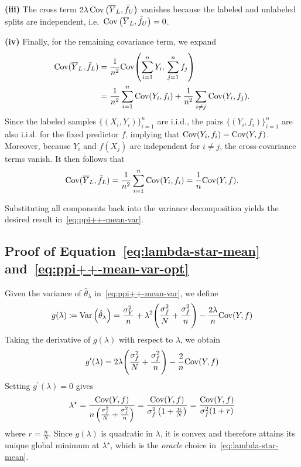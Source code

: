 \noindent
\textbf{(iii)} The cross term 
$2\lambda\,\mathrm{Cov}\left(\overline{Y}_L,\bar f_U\right)$ vanishes 
because the labeled and unlabeled splits are independent, i.e.\
$\mathrm{Cov}\left(\overline{Y}_L,\bar f_U\right)=0$.

\noindent
\textbf{(iv)} Finally, for the remaining covariance term, we expand
\begin{align*}
    \mathrm{Cov}(\overline{Y}_L,\bar f_L)
    &=\frac{1}{n^2}\mathrm{Cov}\!\left(\sum_{i=1}^n Y_i,\,\sum_{j=1}^n f_j\right)\\
    &=\frac{1}{n^2}\sum_{i=1}^n\mathrm{Cov}(Y_i,f_i)
      +\frac{1}{n^2}\sum_{i\neq j}\mathrm{Cov}(Y_i,f_j).
\end{align*}
Since the labeled samples $\{(X_i, Y_i)\}_{i=1}^n$ are i.i.d., 
the pairs $\{(Y_i, f_i)\}_{i=1}^n$ are also i.i.d. for the fixed predictor $f$, 
implying that $\mathrm{Cov}(Y_i,f_i)=\mathrm{Cov}(Y,f)$. Moreover, because $Y_i$ and $f(X_j)$ are independent for $i \neq j$, 
the cross-covariance terms vanish. It then follows that\[
    \mathrm{Cov}(\overline{Y}_L,\bar f_L)
    = \frac{1}{n^2}\sum_{i=1}^n \mathrm{Cov}(Y_i,f_i)
    = \frac{1}{n}\mathrm{Cov}(Y,f).
\]

\noindent
Substituting all components back into the variance decomposition yields the desired result in~\eqref{eq:ppi++-mean-var}.

\subsection{Proof of Equation~\eqref{eq:lambda-star-mean} and~\eqref{eq:ppi++-mean-var-opt}}
Given the variance of $\hat{\theta}_\lambda$ in~\eqref{eq:ppi++-mean-var}, we define \[
g(\lambda)\coloneqq\mathrm{Var}\left(\hat{\theta}_\lambda\right)
=\frac{\sigma_Y^2}{n}
+\lambda^2\Bigg(\frac{\sigma_f^2}{N}+\frac{\sigma_f^2}{n}\Bigg)
-\frac{2\lambda}{n}\mathrm{Cov}(Y,f)\]
Taking the derivative of $g(\lambda)$ with respect to $\lambda$, we obtain
\begin{align*}
    g^\prime(\lambda)= 2\lambda\Bigg(\frac{\sigma_f^2}{N}+\frac{\sigma_f^2}{n}\Bigg)-\frac{2}{n}\mathrm{Cov}(Y,f)
\end{align*}
Setting $g^\prime(\lambda)=0$ gives \[\lambda^\star=\frac{\mathrm{Cov}(Y,f)}{n\left(\frac{\sigma_f^2}{N}+\frac{\sigma_f^2}{n}\right)}=\frac{\mathrm{Cov}(Y,f)}{\sigma_f^2\left(1+\frac{n}{N}\right)}=\frac{\mathrm{Cov}(Y,f)}{\sigma_f^2(1+r)}\]where $r=\frac{n}{N}$. Since $g(\lambda)$ is quadratic in $\lambda$, it is convex and therefore attains its unique global minimum at $\lambda^\star$, which is the \emph{oracle} choice in~\eqref{eq:lambda-star-mean}.

